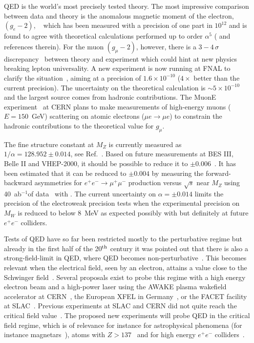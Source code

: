 \documentclass[../report.tex]{subfiles}
\newcommand{\ew}{electroweak\xspace}
\newcommand{\epem}{e^{+}e^{-}}
\newcommand{\iab}{ab$^{-1}$}
\begin{document}
QED is the world's most precisely tested theory. The most impressive comparison between data and theory is the anomalous magnetic moment of the electron, $(g_e-2)$, ~\cite{Odom:2006zz,Gabrielse:2006gg} which has been measured with a precision of one part in $10^{12}$ and is found to agree with theoretical calculations performed up to order $\alpha^{5}$ (\cite{Volkov:2017xaq} and references therein). For the muon $(g_\mu-2)$, however, there is a $3-4\,\sigma$ discrepancy~\cite{Blum:2013xva,Jegerlehner:2018zrj} between theory and experiment which could hint at new physics breaking lepton universality. A new experiment is now running at FNAL to clarify the situation~\cite{Grange:2015fou}, aiming at a precision of $1.6\times 10^{-10}$ ($4\times$ better than the current precision). The uncertainty on the theoretical calculation is $\sim 5\times 10^{-10}$ and the largest source comes from hadronic contributions. The MuonE experiment~\cite{Abbiendi:2016xup} at CERN plans to make measurements of high-energy muons ($E=150$~GeV) scattering on atomic electrons ($\mu e\to \mu e$) to constrain the hadronic contributions to the theoretical value for $g_\mu$.

The fine structure constant at $M_Z$ is currently measured as $1/\alpha=128.952 \pm 0.014$, see Ref.~\cite{PhysRevD.98.030001}. 
Based on future measurements at BES III, Belle II and VHEP-2000, it should be possible to reduce it to $\pm 0.006$~\cite{Blondel:2019vdq}. 
It has been estimated that it can be reduced to $\pm 0.004$ by measuring the forward-backward asymmetries for 
$e^+e^- \to \mu^+\mu^-$ production versus $\sqrt{s}$ near $M_Z$ using 40~\iab of data~\cite{Janot:2015gjr} with \FCCee. The current uncertainty on $\alpha=\pm 0.014$ limits the precision of the \ew precision tests when the experimental precision on $M_W$ is reduced to below 8~MeV as expected possibly with \HLLHC but definitely at future $\epem$ colliders.

Tests of QED have so far been restricted mostly to the perturbative regime but already in the first half of the 20$^{\rm th}$ century it was pointed out that there is also a strong-field-limit in QED, where QED becomes non-perturbative~\cite{Sauter:1931zz,Heisenberg:1935qt}. This becomes relevant when the electrical field, seen by an electron, attains a value close to the Schwinger field~\cite{Schwinger:1951nm}. Several proposals exist to probe this regime with a high energy electron beam and a high-power laser using the AWAKE plasma wakefield accelerator at CERN~\cite{Caldwell:2018atq}, the European XFEL in Germany~\cite{Altarelli:2006zza}, or the FACET facility at SLAC~\cite{SLAC:2016van}. Previous experiments at SLAC and CERN did not quite reach the critical field value~\cite{Burke:1997ew,Andersen:2012ea}. The proposed new experiments will probe QED in the critical field regime, which is of relevance for instance for astrophysical phenomena (for instance magnetars~\cite{Kouveliotou:1998ze}), atoms with $Z>137$~\cite{pomeranchuk} and for high energy $e^+e^-$ colliders~\cite{Bell:1987rw, Blankenbecler:1988te}. 
\end{document}
